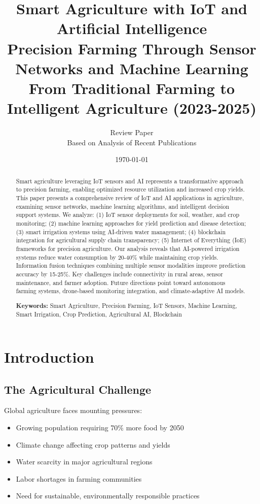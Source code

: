 \documentclass[12pt,a4paper]{article}
\title{
\vspace{-1cm}
{\Huge\bfseries Smart Agriculture with IoT and Artificial Intelligence}\\[0.5cm]
{\Large Precision Farming Through Sensor Networks and Machine Learning}\\[0.3cm]
{\large From Traditional Farming to Intelligent Agriculture (2023-2025)}
}
\author{
\large Review Paper\\[0.2cm]
\normalsize Based on Analysis of Recent Publications
}
\date{\today}
\begin{document}
\maketitle
\thispagestyle{empty}

\begin{abstract}
\noindent
Smart agriculture leveraging IoT sensors and AI represents a transformative approach to precision farming, enabling optimized resource utilization and increased crop yields. This paper presents a comprehensive review of IoT and AI applications in agriculture, examining sensor networks, machine learning algorithms, and intelligent decision support systems. We analyze: (1) IoT sensor deployments for soil, weather, and crop monitoring; (2) machine learning approaches for yield prediction and disease detection; (3) smart irrigation systems using AI-driven water management; (4) blockchain integration for agricultural supply chain transparency; (5) Internet of Everything (IoE) frameworks for precision agriculture. Our analysis reveals that AI-powered irrigation systems reduce water consumption by 20-40\% while maintaining crop yields. Information fusion techniques combining multiple sensor modalities improve prediction accuracy by 15-25\%. Key challenges include connectivity in rural areas, sensor maintenance, and farmer adoption. Future directions point toward autonomous farming systems, drone-based monitoring integration, and climate-adaptive AI models.

\vspace{0.3cm}
\noindent\textbf{Keywords:} Smart Agriculture, Precision Farming, IoT Sensors, Machine Learning, Smart Irrigation, Crop Prediction, Agricultural AI, Blockchain
\end{abstract}

\newpage
\tableofcontents
\newpage

\section{Introduction}

\subsection{The Agricultural Challenge}

Global agriculture faces mounting pressures:
\begin{itemize}[leftmargin=*]
    \item Growing population requiring 70\% more food by 2050
    \item Climate change affecting crop patterns and yields
    \item Water scarcity in major agricultural regions
    \item Labor shortages in farming communities
    \item Need for sustainable, environmentally responsible practices
\end{itemize}
\end{document}

